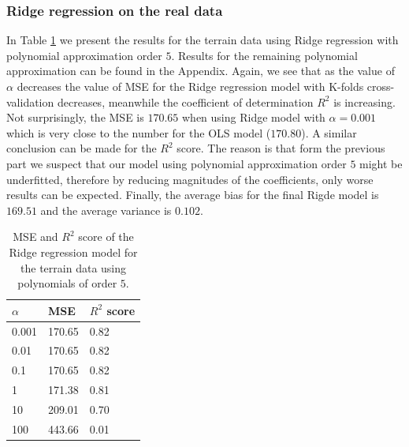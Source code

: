 \documentclass [11pt]{article}
\begin{document}
\subsubsection{Ridge regression on the real data}
In Table \ref{tab:ridge5Terrain} we present the results for the terrain data using Ridge regression with polynomial approximation order $5$. Results for the remaining polynomial approximation can be found in the Appendix. Again, we see that as the value of $\alpha$ decreases the value of MSE for the Ridge regression model with K-folds cross-validation decreases, meanwhile the coefficient of determination $R^{2}$ is increasing.\\
Not surprisingly, the MSE is $170.65$ when using Ridge model with $\alpha=0.001$ which is very close to the number for the OLS model ($170.80$). A similar conclusion can be made for the $R^{2}$ score. The reason is that form the previous part we suspect that our model using polynomial approximation order $5$ might be underfitted, therefore by reducing magnitudes of the coefficients, only worse  results can be expected. Finally, the average bias for the final Rigde model is $169.51$ and the average variance is $0.102$.


\begin{table}[H]
\centering
\begin{tabular}{lll}
\hline
$\alpha$ & MSE    & $R^{2}$ score \\ \hline
0.001     & 170.65 & 0.82          \\
0.01      & 170.65 & 0.82          \\
0.1       & 170.65 & 0.82         \\
1         & 171.38 & 0.81          \\
10        & 209.01 & 0.70          \\
100       & 443.66 & 0.01          \\ \hline
\end{tabular}
\caption{MSE and $R^{2}$ score of the Ridge regression model for the terrain data using polynomials of order $5$.}
\label{tab:ridge5Terrain}
\end{table}
\end{document}
